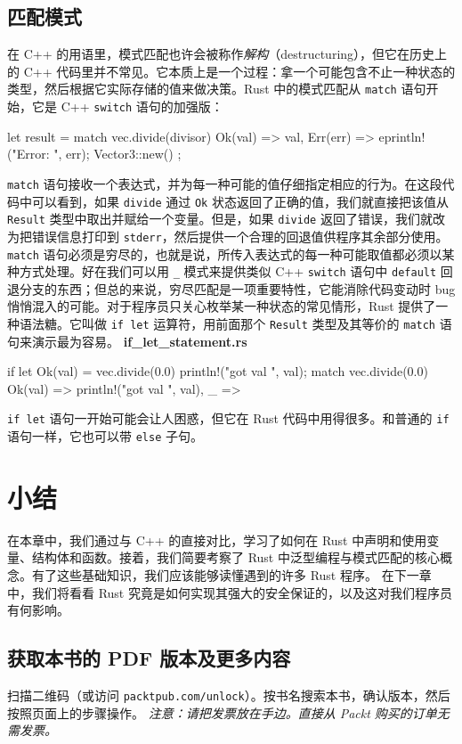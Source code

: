 \subsection{匹配模式}
\label{idx:idx_23efaf34}
\label{idx:idx_bb44277f}
在 C++ 的用语里，模式匹配也许会被称作\emph{解构}（destructuring），但它在历史上的 C++ 代码里并不常见。它本质上是一个过程：拿一个可能包含不止一种状态的类型，然后根据它实际存储的值来做决策。Rust 中的模式匹配从 \texttt{match} 语句开始，它是 C++ \texttt{switch} 语句的加强版：
\begin{codebox}[rust]
let result = match vec.divide(divisor) {
    Ok(val) => val,
    Err(err) => {
        eprintln!("Error: {}", err);
        Vector3::new()
    }
};
\end{codebox}
\label{idx:idx_7b993c66}
\texttt{match} 语句接收一个表达式，并为每一种可能的值仔细指定相应的行为。在这段代码中可以看到，如果 \texttt{divide} 通过 \texttt{Ok} 状态返回了正确的值，我们就直接把该值从 \texttt{Result} 类型中取出并赋给一个变量。但是，如果 \texttt{divide} 返回了错误，我们就改为把错误信息打印到 \texttt{stderr}，然后提供一个合理的回退值供程序其余部分使用。
\label{idx:idx_18c2d82b}
\label{idx:idx_ea618216}
\texttt{match} 语句必须是穷尽的，也就是说，所传入表达式的每一种可能取值都必须以某种方式处理。好在我们可以用 \texttt{\_} 模式来提供类似 C++ \texttt{switch} 语句中 \texttt{default} 回退分支的东西；但总的来说，穷尽匹配是一项重要特性，它能消除代码变动时 bug 悄悄混入的可能。对于程序员只关心枚举某一种状态的常见情形，Rust 提供了一种语法糖。它叫做 \texttt{if let} 运算符，用前面那个 \texttt{Result} 类型及其等价的 \texttt{match} 语句来演示最为容易。
\textbf{if\_\allowbreak{}let\_\allowbreak{}statement.\allowbreak{}rs}
\begin{codebox}[rust]
if let Ok(val) = vec.divide(0.0) {
    println!("got val {}", val);
}
match vec.divide(0.0) {
    Ok(val) => println!("got val {}", val),
    _ => {}
}
\end{codebox}
\texttt{if let} 语句一开始可能会让人困惑，但它在 Rust 代码中用得很多。和普通的 \texttt{if} 语句一样，它也可以带 \texttt{else} 子句。
\section{小结}
在本章中，我们通过与 C++ 的直接对比，学习了如何在 Rust 中声明和使用变量、结构体和函数。接着，我们简要考察了 Rust 中泛型编程与模式匹配的核心概念。有了这些基础知识，我们应该能够读懂遇到的许多 Rust 程序。
在下一章中，我们将看看 Rust 究竟是如何实现其强大的安全保证的，以及这对我们程序员有何影响。
\begin{samepage}
\subsection{获取本书的 PDF 版本及更多内容}
扫描二维码（或访问 \texttt{packtpub.\allowbreak{}com/\allowbreak{}unlock}）。按书名搜索本书，确认版本，然后按照页面上的步骤操作。
\emph{注意：请把发票放在手边。直接从 Packt 购买的订单无需发票。}
\end{samepage}
